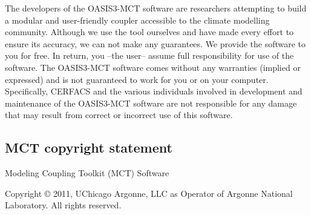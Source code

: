 The developers of the OASIS3-MCT software are researchers attempting to
build a modular and user-friendly coupler accessible to the climate
modelling community. Although we use the tool ourselves and have made
every effort to ensure its accuracy, we can not make any
guarantees. We provide the software to you for free. In return,
you --the user-- assume full responsibility for use of the software. The
OASIS3-MCT software comes without any warranties (implied or expressed) and
is not guaranteed to work for you or on your computer. Specifically,
CERFACS and the various individuals involved in development and
maintenance of the OASIS3-MCT software are not responsible for any damage
that may result from correct or incorrect use of this software.

\subsection{MCT copyright statement}
\label{sec_MCT}

                            Modeling Coupling Toolkit (MCT) Software

Copyright © 2011, UChicago Argonne, LLC as Operator of Argonne National Laboratory. All rights reserved.

